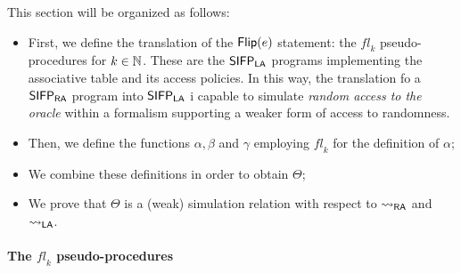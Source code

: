 
This section will be organized as follows:

\begin{itemize}
  \item First, we define the translation of the $\mathsf{Flip(}e\mathsf{)}$ statement: the $\mathit{fl}_k$
  pseudo-procedures for $k \in \mathbb{N}$. These are the $\mathsf{SIFP_{{\mathsf{LA}}}}$ programs
  implementing the associative table and its access policies. In this way,
  the translation fo a $\mathsf{SIFP_{{\mathsf{RA}}}}$ program into $\mathsf{SIFP_{{\mathsf{LA}}}}$ i capable to
  simulate \emph{random access to the oracle} within a formalism supporting a
  weaker form of access to randomness.
  \item Then, we define the functions
  $\alpha, \beta$ and $\gamma$ employing $\mathit{fl}_k$ for the definition of $\alpha$;
  \item We combine these definitions in order to obtain $\Theta$;
  \item We prove that $\Theta$ is a (weak) simulation relation with respect to
  ${\leadsto_{\mathsf{RA}}}$ and ${\leadsto_{\mathsf{LA}}}$.
\end{itemize}










\paragraph*{The $\mathit{fl}_k$ pseudo-procedures}


